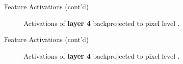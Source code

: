 \documentclass{beamer}
\begin{document}
	\begin{frame}{Feature Activations (cont'd)}
		\begin{figure}
			\centering
			\caption{Activations of \textbf{layer 4} backprojected to pixel level \cite{ZeilerFergus:2013}.}
		\end{figure}
	\end{frame}
	
	\begin{frame}{Feature Activations (cont'd)}
		\begin{figure}
			\centering
			\caption{Activations of \textbf{layer 4} backprojected to pixel level \cite{ZeilerFergus:2013}.}
		\end{figure}
	\end{frame}
	
\end{document}
